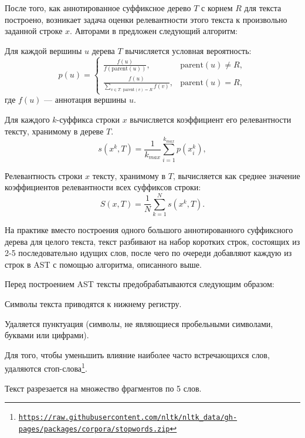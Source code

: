 \documentclass[12pt]{article}
\newenvironment{enumerate*}%
{\begin{enumerate}%
	\setlength{\itemsep}{0pt}%
	\setlength{\parskip}{0pt}}%
{\end{enumerate}}
\newcommand{\hrefl}[1] {\texttt{\href{#1}{#1}}}
\begin{document}
После того, как аннотированное суффиксное дерево $T$ с корнем $R$ для текста построено, возникает задача оценки релевантности этого текста к произвольно заданной строке $x$. Авторами в \cite{MirkinChernyak2012} предложен следующий алгоритм:
\begin{enumerate*}
	
	\item  Для каждой вершины $u$ дерева $T$ вычисляется условная вероятность:
	{\sffamily
	\begin{equation}
		p(u)=\begin{cases}
			\displaystyle	\frac{f(u)}{f(\text{parent}(u))}, & \text{parent}(u) \ne R,\\[15pt]
			\displaystyle	\frac{f(u)}{\sum_{v\in T:\ \text{parent}(v)=R}f(v)}, & \text{parent}(u) = R,
		\end{cases}
	\end{equation}
	}
	где $f(u)$ --- аннотация вершины $u$. 
	\item Для каждого $k$-суффикса строки $x$ вычисляется коэффициент его релевантности тексту, хранимому в дереве $T$. 
	\begin{equation}
		s(x^k, T)=\frac{1}{k_{max}}\sum_{i=1}^{k_{max}}p(x_i^k),
	\end{equation}
	\item Релевантность строки $x$ тексту, хранимому в $T$, вычисляется как среднее значение коэффициентов релевантности всех суффиксов строки:
	\begin{equation}
		S(x,T)=\frac1N\sum_{k=1}^{N}s(x^k, T).
	\end{equation}
\end{enumerate*}

На практике вместо построения одного большого аннотированного суффиксного дерева для целого текста, текст разбивают на набор коротких строк, состоящих из 2-5 последовательно идущих слов, после чего по очереди добавляют каждую из строк в AST с помощью алгоритма, описанного выше.

Перед построением AST тексты предобрабатываются следующим образом:
\begin{enumerate*}
	\item Символы текста приводятся к нижнему регистру.
	\item Удаляется пунктуация (символы, не являющиеся пробельными символами, буквами или цифрами).
	\item Для того, чтобы уменьшить влияние наиболее часто встречающихся слов, удаляются стоп-слова\footnote{\hrefl{https://raw.githubusercontent.com/nltk/nltk\_data/gh-pages/packages/corpora/stopwords.zip}}.
	\item Текст разрезается на множество фрагментов по 5 слов.
\end{enumerate*}
\end{document}
